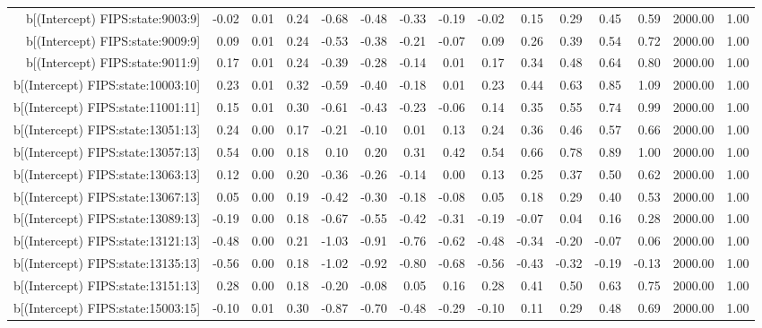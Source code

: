 \begin{table}[ht]
\begin{tabular}{rrrrrrrrrrrrrrr}
  b[(Intercept) FIPS:state:9003:9] & -0.02 & 0.01 & 0.24 & -0.68 & -0.48 & -0.33 & -0.19 & -0.02 & 0.15 & 0.29 & 0.45 & 0.59 & 2000.00 & 1.00 \\ 
  b[(Intercept) FIPS:state:9009:9] & 0.09 & 0.01 & 0.24 & -0.53 & -0.38 & -0.21 & -0.07 & 0.09 & 0.26 & 0.39 & 0.54 & 0.72 & 2000.00 & 1.00 \\ 
  b[(Intercept) FIPS:state:9011:9] & 0.17 & 0.01 & 0.24 & -0.39 & -0.28 & -0.14 & 0.01 & 0.17 & 0.34 & 0.48 & 0.64 & 0.80 & 2000.00 & 1.00 \\ 
  b[(Intercept) FIPS:state:10003:10] & 0.23 & 0.01 & 0.32 & -0.59 & -0.40 & -0.18 & 0.01 & 0.23 & 0.44 & 0.63 & 0.85 & 1.09 & 2000.00 & 1.00 \\ 
  b[(Intercept) FIPS:state:11001:11] & 0.15 & 0.01 & 0.30 & -0.61 & -0.43 & -0.23 & -0.06 & 0.14 & 0.35 & 0.55 & 0.74 & 0.99 & 2000.00 & 1.00 \\ 
  b[(Intercept) FIPS:state:13051:13] & 0.24 & 0.00 & 0.17 & -0.21 & -0.10 & 0.01 & 0.13 & 0.24 & 0.36 & 0.46 & 0.57 & 0.66 & 2000.00 & 1.00 \\ 
  b[(Intercept) FIPS:state:13057:13] & 0.54 & 0.00 & 0.18 & 0.10 & 0.20 & 0.31 & 0.42 & 0.54 & 0.66 & 0.78 & 0.89 & 1.00 & 2000.00 & 1.00 \\ 
  b[(Intercept) FIPS:state:13063:13] & 0.12 & 0.00 & 0.20 & -0.36 & -0.26 & -0.14 & 0.00 & 0.13 & 0.25 & 0.37 & 0.50 & 0.62 & 2000.00 & 1.00 \\ 
  b[(Intercept) FIPS:state:13067:13] & 0.05 & 0.00 & 0.19 & -0.42 & -0.30 & -0.18 & -0.08 & 0.05 & 0.18 & 0.29 & 0.40 & 0.53 & 2000.00 & 1.00 \\ 
  b[(Intercept) FIPS:state:13089:13] & -0.19 & 0.00 & 0.18 & -0.67 & -0.55 & -0.42 & -0.31 & -0.19 & -0.07 & 0.04 & 0.16 & 0.28 & 2000.00 & 1.00 \\ 
  b[(Intercept) FIPS:state:13121:13] & -0.48 & 0.00 & 0.21 & -1.03 & -0.91 & -0.76 & -0.62 & -0.48 & -0.34 & -0.20 & -0.07 & 0.06 & 2000.00 & 1.00 \\ 
  b[(Intercept) FIPS:state:13135:13] & -0.56 & 0.00 & 0.18 & -1.02 & -0.92 & -0.80 & -0.68 & -0.56 & -0.43 & -0.32 & -0.19 & -0.13 & 2000.00 & 1.00 \\ 
  b[(Intercept) FIPS:state:13151:13] & 0.28 & 0.00 & 0.18 & -0.20 & -0.08 & 0.05 & 0.16 & 0.28 & 0.41 & 0.50 & 0.63 & 0.75 & 2000.00 & 1.00 \\ 
  b[(Intercept) FIPS:state:15003:15] & -0.10 & 0.01 & 0.30 & -0.87 & -0.70 & -0.48 & -0.29 & -0.10 & 0.11 & 0.29 & 0.48 & 0.69 & 2000.00 & 1.00 \\ 

\end{tabular}
\end{table}
